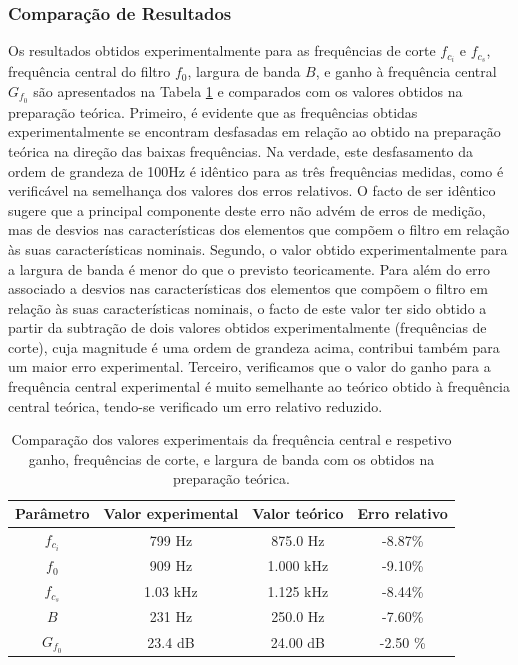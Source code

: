 \subsubsection{Comparação de Resultados}
Os resultados obtidos experimentalmente para as frequências de corte $f_{c_i}$ e $f_{c_s}$, frequência central do filtro $f_0$, largura de banda $B$, e ganho à frequência central $G_{f_0}$ são apresentados na Tabela \ref{tb:freqsRauch} e comparados com os valores obtidos na preparação teórica. Primeiro, é evidente que as frequências obtidas experimentalmente se encontram desfasadas em relação ao obtido na preparação teórica na direção das baixas frequências. Na verdade, este desfasamento da ordem de grandeza de 100Hz é idêntico para as três frequências medidas, como é verificável na semelhança dos valores dos erros relativos. O facto de ser idêntico sugere que a principal componente deste erro não advém de erros de medição, mas de desvios nas características dos elementos que compõem o filtro em relação às suas características nominais. Segundo, o valor obtido experimentalmente para a largura de banda é menor do que o previsto teoricamente. Para além do erro associado a desvios nas características dos elementos que compõem o filtro em relação às suas características nominais, o facto de este valor ter sido obtido a partir da subtração de dois valores obtidos experimentalmente (frequências de corte), cuja magnitude é uma ordem de grandeza acima, contribui também para um maior erro experimental. Terceiro, verificamos que o valor do ganho para a frequência central experimental é muito semelhante ao teórico obtido à frequência central teórica, tendo-se verificado um erro relativo reduzido.

\begin{table}[h!]
    \centering
    \caption{Comparação dos valores experimentais da frequência central e respetivo ganho, frequências de corte, e largura de banda com os obtidos na preparação teórica.}
    \begin{tabular}{cccc}
    \hline
    Parâmetro & Valor experimental & Valor teórico & Erro relativo \\
    \hline  
    $f_{c_i}$ & 799 Hz  &  875.0 Hz  & -8.87\%  \vspace{0.2cm} \\
    $f_{0}$& 909 Hz  & 1.000 kHz & -9.10\% \vspace{0.2cm} \\
    $f_{c_s}$& 1.03 kHz & 1.125 kHz & -8.44\% \vspace{0.2cm} \\
    $B$ &  231 Hz & 250.0 Hz & -7.60\% \vspace{0.2cm}\\
    $G_{f_0}$ & 23.4 dB  & 24.00 dB & -2.50 \%  \vspace{0.2cm}\\
    \hline
    \end{tabular}
    \label{tb:freqsRauch}
\end{table}

